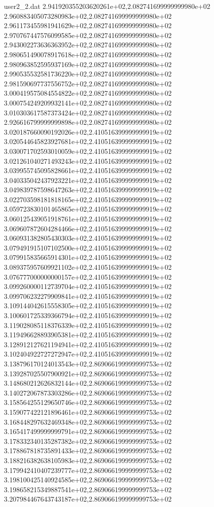 \begin{filecontents}{user2_2.dat}
2.941920355203620261e+02,2.082741699999999980e+02
2.960883405073280983e+02,2.082741699999999980e+02
2.961173455981941629e+02,2.082741699999999980e+02
2.970767447576099585e+02,2.082741699999999980e+02
2.943002273636363952e+02,2.082741699999999980e+02
2.980651490078917618e+02,2.082741699999999980e+02
2.980963852595937169e+02,2.082741699999999980e+02
2.990535532581736220e+02,2.082741699999999980e+02
2.981590697737556752e+02,2.082741699999999980e+02
3.000419575084554822e+02,2.082741699999999980e+02
3.000754249209932141e+02,2.082741699999999980e+02
3.010303617587373424e+02,2.082741699999999980e+02
2.926616799999999898e+02,2.082741699999999980e+02
3.020187660090192026e+02,2.410516399999999919e+02
3.020544645823927681e+02,2.410516399999999919e+02
3.030071702593010059e+02,2.410516399999999919e+02
3.021261040271493243e+02,2.410516399999999919e+02
3.039955745095828661e+02,2.410516399999999919e+02
3.040335042437923221e+02,2.410516399999999919e+02
3.049839787598647263e+02,2.410516399999999919e+02
3.022703598181818165e+02,2.410516399999999919e+02
3.059723830101465865e+02,2.410516399999999919e+02
3.060125439051918761e+02,2.410516399999999919e+02
3.069607872604284466e+02,2.410516399999999919e+02
3.060931382805430303e+02,2.410516399999999919e+02
3.079491915107102500e+02,2.410516399999999919e+02
3.079915835665914301e+02,2.410516399999999919e+02
3.089375957609921102e+02,2.410516399999999919e+02
3.076777000000000157e+02,2.410516399999999919e+02
3.099260000112739704e+02,2.410516399999999919e+02
3.099706232279909841e+02,2.410516399999999919e+02
3.109144042615558305e+02,2.410516399999999919e+02
3.100601725339366794e+02,2.410516399999999919e+02
3.119028085118376339e+02,2.410516399999999919e+02
3.119496628893905381e+02,2.410516399999999919e+02
3.128912127621194941e+02,2.410516399999999919e+02
3.102404922727272947e+02,2.410516399999999919e+02
3.138796170124013543e+02,2.869066199999999753e+02
3.139287025507900921e+02,2.869066199999999753e+02
3.148680212626832144e+02,2.869066199999999753e+02
3.140272067873303286e+02,2.869066199999999753e+02
3.158564255129650746e+02,2.869066199999999753e+02
3.159077422121896461e+02,2.869066199999999753e+02
3.168448297632469348e+02,2.869066199999999753e+02
3.165417499999999791e+02,2.869066199999999753e+02
3.178332340135287382e+02,2.869066199999999753e+02
3.178867818735891433e+02,2.869066199999999753e+02
3.188216382638105983e+02,2.869066199999999753e+02
3.179942410407239777e+02,2.869066199999999753e+02
3.198100425140924585e+02,2.869066199999999753e+02
3.198658215349887541e+02,2.869066199999999753e+02
3.207984467643743187e+02,2.869066199999999753e+02

\end{filecontents}
